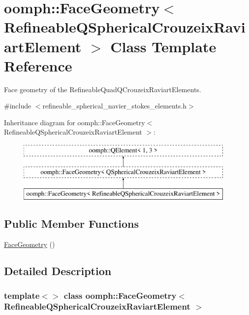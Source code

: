\hypertarget{classoomph_1_1FaceGeometry_3_01RefineableQSphericalCrouzeixRaviartElement_01_4}{}\section{oomph\+:\+:Face\+Geometry$<$ Refineable\+Q\+Spherical\+Crouzeix\+Raviart\+Element $>$ Class Template Reference}
\label{classoomph_1_1FaceGeometry_3_01RefineableQSphericalCrouzeixRaviartElement_01_4}


Face geometry of the Refineable\+Quad\+Q\+Crouzeix\+Raviart\+Elements.  




{\ttfamily \#include $<$refineable\+\_\+spherical\+\_\+navier\+\_\+stokes\+\_\+elements.\+h$>$}

Inheritance diagram for oomph\+:\+:Face\+Geometry$<$ Refineable\+Q\+Spherical\+Crouzeix\+Raviart\+Element $>$\+:\begin{figure}[H]
\begin{center}
\leavevmode
\includegraphics[height=3.000000cm]{classoomph_1_1FaceGeometry_3_01RefineableQSphericalCrouzeixRaviartElement_01_4}
\end{center}
\end{figure}
\subsection*{Public Member Functions}
\begin{DoxyCompactItemize}
\item 
\hyperlink{classoomph_1_1FaceGeometry_3_01RefineableQSphericalCrouzeixRaviartElement_01_4_a4c226446f229c15f61393ed6ddd2fc7a}{Face\+Geometry} ()
\end{DoxyCompactItemize}


\subsection{Detailed Description}
\subsubsection*{template$<$$>$\newline
class oomph\+::\+Face\+Geometry$<$ Refineable\+Q\+Spherical\+Crouzeix\+Raviart\+Element $>$}

